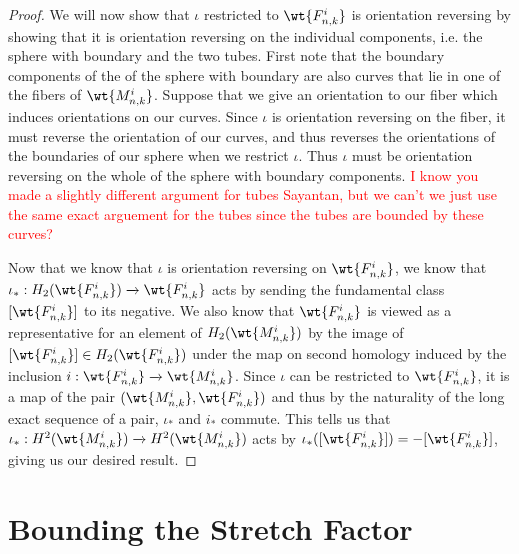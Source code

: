 \begin{proof}
We will now show that $\iota$ restricted to $\wt{F^i_{n,k}}$ is orientation reversing by showing that it is orientation reversing on the individual components, i.e. the sphere with boundary and the two tubes. First note that the boundary components of the of the sphere with boundary are also curves that lie in one of the fibers of $\wt{M^i_{n,k}}$. Suppose that we give an orientation to our fiber which induces orientations on our curves. Since $\iota$ is orientation reversing on the fiber, it must reverse the orientation of our curves, and thus reverses the orientations of the boundaries of our sphere when we restrict $\iota$. Thus $\iota$ must be orientation reversing on the whole of the sphere with boundary components. \textcolor{red}{I know you made a slightly different argument for tubes Sayantan, but we can't we just use the same exact arguement for the tubes since the tubes are bounded by these curves?}

Now that we know that $\iota$ is orientation reversing on $\wt{F^i_{n,k}}$, we know that $\iota_*: H_2(\wt{F^i_{n,k}}) \xrightarrow{} \wt{F^i_{n,k}}$ acts by sending the fundamental class $[\wt{F^i_{n,k}}]$ to its negative. We also know that $\wt{F^i_{n,k}}$ is viewed as a representative for an element of $H_2(\wt{M^i_{n,k}})$ by the image of $[\wt{F^i_{n,k}}] \in H_2(\wt{F^i_{n,k}})$ under the map on second homology induced by the inclusion $i: \wt{F^i_{n,k}} \xrightarrow[]{} \wt{M^i_{n,k}}$. Since $\iota$ can be restricted to $\wt{F^i_{n,k}}$, it is a map of the pair $(\wt{M^i_{n,k}},\wt{F^i_{n,k}})$ and thus by the naturality of the long exact sequence of a pair, $\iota_*$ and $i_*$ commute. This tells us that $\iota_*: H^2(\wt{M^i_{n,k}}) \xrightarrow[]{} H^2(\wt{M^i_{n,k}})$ acts by $\iota_*([\wt{F^i_{n,k}}]) = -[\wt{F^i_{n,k}}]$, giving us our desired result.

\end{proof}

\section{Bounding the Stretch Factor}

